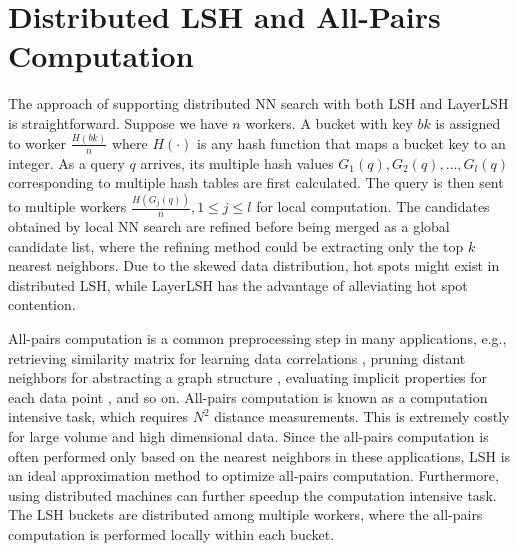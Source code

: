 \section{Distributed LSH and All-Pairs Computation}
\label{sec:distributed}

 The approach of supporting distributed NN search with both LSH and LayerLSH is straightforward. Suppose we have $n$ workers. A bucket with key $bk$ is assigned to worker $\frac{H(bk)}{n}$ where $H(\cdot)$ is any hash function that maps a bucket key to an integer. As a query $q$ arrives, its multiple hash values $G_1(q), G_2(q), \ldots, G_l(q)$ corresponding to multiple hash tables are first calculated. The query is then sent to multiple workers $\frac{H(G_j(q))}{n}, 1\leq j\leq l$ for local computation. The candidates obtained by local NN search are refined before being merged as a global candidate list, where the refining method could be extracting only the top $k$ nearest neighbors. Due to the skewed data distribution, hot spots might exist in distributed LSH, while LayerLSH has the advantage of alleviating hot spot contention.

\begin{comment}
\Paragraph{LSB and LayerLSB} The basic idea of NN search in LSB is bidirectional expansion on an ordered $z$-values list. In distributed implementation, it is intuitive to split the $z$-values list by range partition and let each worker serve for a range of the list. However, hot spots might exist due to skewed data distribution. We assign the dense ranges to additional workers to distribute the heavy workload. Upon receiving a query request, the worker routes the query to additional workers, such that the heavy workload can be shared by redundant workers. Considering the high synchronization cost in distributed processing, a set of local neighbors are returned rather than only one at each time. Similarly, in distributed LayerLSB, the child trees' $z$-values are also split by range partition and allocated to additional workers. Upon receiving a query request, the worker that holds the parent tree first compute its $z$-values with child LSB base, and routes the query to the corresponding workers where the $z$-values are covered.
\end{comment}

 All-pairs computation is a common preprocessing step in many applications, e.g., retrieving similarity matrix for learning data correlations \cite{allpair1}, pruning distant neighbors for abstracting a graph structure \cite{ap}, evaluating implicit properties for each data point \cite{lshcluster}, and so on. All-pairs computation is known as a computation intensive task, which requires $N^2$ distance measurements. This is extremely costly for large volume and high dimensional data. Since the all-pairs computation is often performed only based on the nearest neighbors in these applications, LSH is an ideal approximation method to optimize all-pairs computation. Furthermore, using distributed machines can further speedup the computation intensive task. The LSH buckets are distributed among multiple workers, where the all-pairs computation is performed locally within each bucket.


